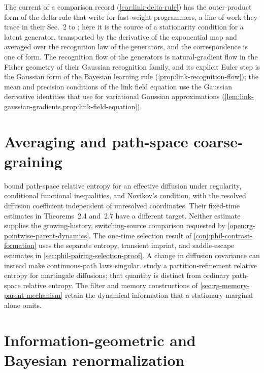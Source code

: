 The current of a comparison record (\cref{cor:link-delta-rule}) has the outer-product form of the delta
rule that \citet[Sec.~4.2, Eq.~(24)]{Schlag2021} write for fast-weight programmers, a line of work they
trace in their Sec.~2 to \citet{Schmidhuber1992}; here it is the source of a stationarity
condition for a latent generator, transported by the derivative of the exponential map and averaged over
the recognition law of the generators, and the correspondence is one of form. The recognition flow of the
generators is natural-gradient flow in the Fisher geometry of their Gaussian recognition family, and its
explicit Euler step is the Gaussian form of the Bayesian learning rule \citep[Eq.~(12)]{KhanRue2023}
(\cref{prop:link-recognition-flow}); the mean and precision conditions of the link field equation use the
Gaussian derivative identities that \citet[Eqs.~(18)--(19)]{OpperArchambeau2009} use for variational
Gaussian approximations (\cref{lem:link-gaussian-gradients,prop:link-field-equation}).

\section{Averaging and path-space coarse-graining}

\citet[Section~2.1.4, Theorem~2.9]{HartmannNeureitherSharma2020}
bound path-space relative entropy for an effective diffusion under regularity,
conditional functional inequalities, and Novikov's condition, with the
resolved diffusion coefficient independent of unresolved coordinates. Their
fixed-time estimates in Theorems~2.4 and~2.7 have a different target. Neither
estimate supplies the growing-history, switching-source comparison requested
by \cref{open:rg-pointwise-parent-dynamics}. The one-time selection result
of \cref{conj:phil-contrast-formation} uses the separate entropy, transient
imprint, and saddle-escape estimates in \cref{sec:phil-pairing-selection-proof}.
A change in diffusion covariance can instead make continuous-path laws
singular. \citet[Remark~1 and Theorem~1]{BackhoffUnterberger2023}
study a partition-refinement relative entropy for martingale diffusions;
that quantity is distinct from ordinary path-space relative entropy. The
filter and memory constructions of \cref{sec:rg-memory-parent-mechanism}
retain the dynamical information that a stationary marginal alone omits.

\section{Information-geometric and Bayesian renormalization}
\label{sec:rg-bayesian-comparison}
\label{sec:obs-tau}

